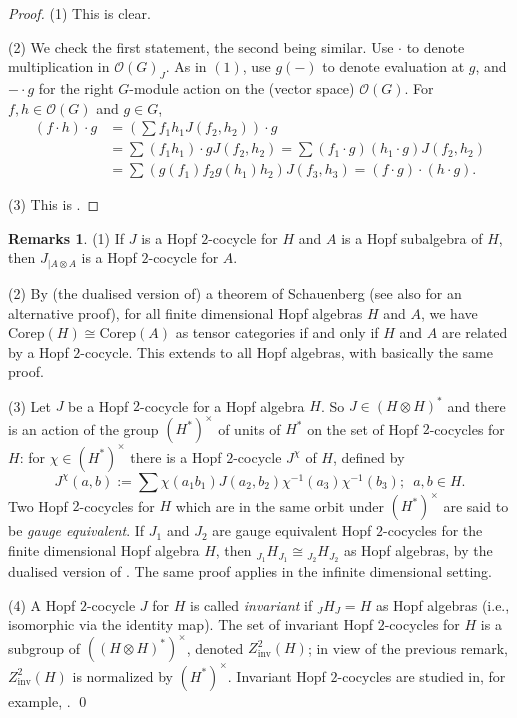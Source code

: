 \documentclass{amsart}
\numberwithin{equation}{section}
\theoremstyle{definition}
\newtheorem{remarks}[theorem]{Remarks}
\begin{document}
\begin{proof}
(1) This is clear.

(2) We check the first statement, the second being similar. Use $\cdot$ to denote multiplication in $\mathcal{O}(G)_J$. As in $(1)$, use $g(-)$ to denote evaluation at $g$, and $-\cdot g$ for the right $G$-module action on the (vector space) $\mathcal{O}(G)$. For $f,h \in \mathcal{O}(G)$ and $g \in G$,
\begin{align*} 
(f\cdot h)\cdot g &=\left(\sum f_1 h_1J(f_2,h_2)\right)\cdot g \\
&= \sum (f_1  h_1)\cdot g J(f_2,h_2)
= \sum (f_1\cdot g) (h_1\cdot g) J(f_2, h_2) \\
&= \sum(g(f_1)f_2 g(h_1)h_2) J(f_3,h_3)= (f\cdot g)\cdot (h\cdot g).
\end{align*}

(3) This is \cite[Lemma 2.2]{G2}.
\end{proof}

\begin{remarks}\label{Jrems}
(1) If $J$ is a Hopf $2$-cocycle for $H$ and $A$ is a Hopf subalgebra of $H$, then $J_{|A \otimes A}$ is a Hopf $2$-cocycle for $A$.

(2) By (the dualised version of) a theorem of Schauenberg \cite{S} (see also \cite{EG5} for an alternative proof), for all finite dimensional Hopf algebras $H$ and $A$, we have $\mathrm{Corep}(H)\cong \mathrm{Corep}(A)$ as tensor categories if and only if $H$ and $A$ are related by a Hopf $2$-cocycle. This extends to all Hopf algebras, with basically the same proof.

(3) Let $J$ be a Hopf $2$-cocycle for a Hopf algebra $H$. So $J \in (H \otimes H)^{\ast}$ and there is an action of the group $(H^*)^{\times}$ of units of $H^{\ast}$ on the set of Hopf $2$-cocycles for $H$: for $\chi\in (H^*)^{\times}$ there is a Hopf $2$-cocycle $J^{\chi}$ of $H$, defined by 
$$ J^{\chi} (a,b):=\sum \chi(a_1b_1) J(a_2, b_2) \chi^{-1}(a_3)\chi^{-1}(b_3);\,\,\,a,b \in H.$$
Two Hopf $2$-cocycles for $H$ which are in the same orbit under $(H^*)^{\times}$ are said to be \emph{gauge equivalent}. If $J_1$ and $J_2$ are gauge equivalent Hopf $2$-cocycles for the finite dimensional Hopf algebra $H$, then ${}_{J_1} H_{J_1} \cong {}_{J_2}H_{J_2}$ as Hopf algebras, by the dualised version of \cite[page 115]{EGNO}. The same proof applies in the infinite dimensional setting.

(4) A Hopf $2$-cocycle $J$ for $H$ is called \emph{invariant} if $_JH_J=H$ as Hopf algebras \cite[p.2]{G2} (i.e., isomorphic via the identity map). The set of invariant Hopf $2$-cocycles for $H$ is a subgroup of $((H \otimes H)^*)^{\times}$, denoted $Z^2_{\mathrm{inv}}(H)$; in view of the previous remark, $Z^2_{\mathrm{inv}}(H)$ is normalized by $(H^*)^{\times}$. Invariant Hopf $2$-cocycles are studied in, for example, \cite{BC, EG4,S2}. \qed
\end{remarks}
\end{document}
